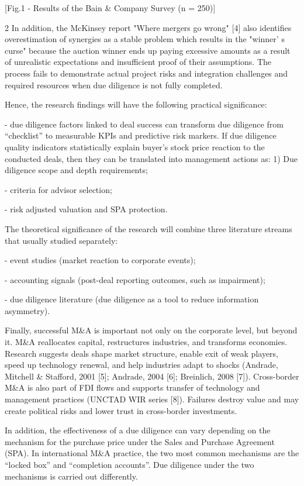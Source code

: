 [Fig.1 - Results of the Bain \& Company Survey (n = 250)]

\begin{multicols}{2}
In addition, the McKinsey report "Where mergers go wrong" {[}4{]} also
identifies overestimation of synergies as a stable problem which results
in the "winner' s curse" because the auction winner ends
up paying excessive amounts as a result of unrealistic expectations and
insufficient proof of their assumptions. The process fails to
demonstrate actual project risks and integration challenges and required
resources when due diligence is not fully completed.

Hence, the research findings will have the following practical
significance:

- due diligence factors linked to deal success can transform due
diligence from ``checklist'' to measurable KPIs and predictive risk
markers. If due diligence quality indicators statistically explain
buyer's stock price reaction to the conducted deals, then they can be
translated into management actions as: 1) Due diligence scope and depth
requirements;

- criteria for advisor selection;

- risk adjusted valuation and SPA protection.

The theoretical significance of the research will combine three
literature streams that usually studied separately:

- event studies (market reaction to corporate events);

- accounting signals (post-deal reporting outcomes, such as impairment);

- due diligence literature (due diligence as a tool to reduce
information asymmetry).

Finally, successful M\&A is important not only on the corporate level,
but beyond it. M\&A reallocates capital, restructures industries, and
transforms economies. Research suggests deals shape market structure,
enable exit of weak players, speed up technology renewal, and help
industries adapt to shocks (Andrade, Mitchell \& Stafford, 2001 {[}5{]};
Andrade, 2004 {[}6{]}; Breinlich, 2008 {[}7{]}). Cross-border M\&A is
also part of FDI flows and supports transfer of technology and
management practices (UNCTAD WIR series {[}8{]}). Failures destroy value
and may create political risks and lower trust in cross-border
investments.

In addition, the effectiveness of a due diligence can vary depending on
the mechanism for the purchase price under the Sales and Purchase
Agreement (SPA). In international M\&A practice, the two most common
mechanisms are the ``locked box'' and ``completion accounts''. Due
diligence under the two mechanisms is carried out differently.


\end{multicols}
